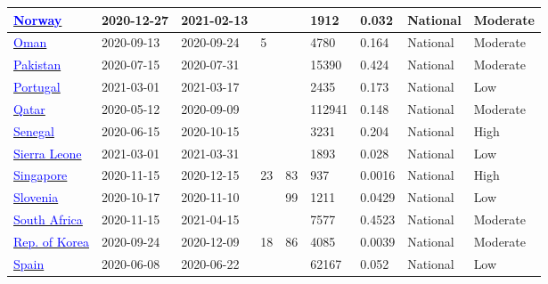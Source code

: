 \begin{table}[ht]
\begin{center}
\begin{tabular}{p{2cm} | p{1.6cm} | p{1.6cm} | p{0.8cm} | p{0.8cm} | p{1cm} | p{1.3cm} | p{1.2cm} | p{1.2cm}}
           \hline 
           \href{https://dx.doi.org/10.1111/irv.12932}{\textcolor{blue}{Norway}} & 2020-12-27 & 2021-02-13 &  &  & 1912 & 0.032 & National & Moderate \\ 
           \hline 
           \href{https://dx.doi.org/10.1016/j.ijid.2021.09.062}{\textcolor{blue}{Oman}} & 2020-09-13 & 2020-09-24 & 5 &  & 4780 & 0.164 & National & Moderate \\ 
           \hline 
           \href{https://dx.doi.org/10.1007/s15010-021-01629-2}{\textcolor{blue}{Pakistan}} & 2020-07-15 & 2020-07-31 &  &  & 15390 & 0.424 & National & Moderate \\ 
           \hline 
           \href{https://europepmc.org/article/PPR/PPR359402}{\textcolor{blue}{Portugal}} & 2021-03-01 & 2021-03-17 &  &  & 2435 & 0.173 & National & Low \\ 
           \hline 
           \href{http://dx.doi.org/10.1016/j.isci.2021.102646}{\textcolor{blue}{Qatar}} & 2020-05-12 & 2020-09-09 &  &  & 112941 & 0.148 & National & Moderate \\ 
           \hline 
           \href{https://www.ncbi.nlm.nih.gov/pmc/articles/PMC8702669/}{\textcolor{blue}{Senegal}} & 2020-06-15 & 2020-10-15 &  &  & 3231 & 0.204 & National & High \\ 
           \hline 
           \href{https://gh.bmj.com/content/6/11/e007271}{\textcolor{blue}{Sierra Leone}} & 2021-03-01 & 2021-03-31 &  &  & 1893 & 0.028 & National & Low \\ 
           \hline 
           \href{https://papers.ssrn.com/sol3/papers.cfm?abstract\_id=3826194}{\textcolor{blue}{Singapore}} & 2020-11-15 & 2020-12-15 & 23 & 83 & 937 & 0.0016 & National & High \\ 
           \hline 
           \href{https://dx.doi.org/10.1016/j.cmi.2021.03.009}{\textcolor{blue}{Slovenia}} & 2020-10-17 & 2020-11-10 &  & 99 & 1211 & 0.0429 & National & Low \\ 
           \hline 
           \href{https://dx.doi.org/10.1093/cid/ciac198}{\textcolor{blue}{South Africa}} & 2020-11-15 & 2021-04-15 &  &  & 7577 & 0.4523 & National & Moderate \\ 
           \hline 
           \href{https://bmjopen.bmj.com/content/11/4/e049837.abstract}{\textcolor{blue}{Rep. of Korea}} & 2020-09-24 & 2020-12-09 & 18 & 86 & 4085 & 0.0039 & National & Moderate \\ 
           \hline 
           \href{https://www.mscbs.gob.es/ciudadanos/ene-covid/docs/ESTUDIO\_ENE-COVID19\_INFORME\_FINAL.pdf}{\textcolor{blue}{Spain}} & 2020-06-08 & 2020-06-22 &  &  & 62167 & 0.052 & National & Low \\ 

\end{tabular}
\end{center}
\end{table}
